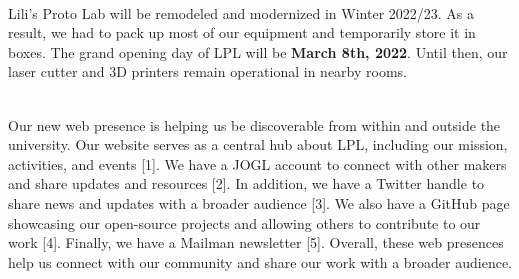 \documentclass{report}
\begin{document}
 \\

Lili's Proto Lab will be remodeled and modernized in Winter 2022/23. As a result, we had to pack up most of our equipment and temporarily store it in boxes. The grand opening day of LPL will be \textbf{March 8th, 2022}. Until then, our laser cutter and 3D printers remain operational in nearby rooms. 

\clearpage
\begin{figure}
    \centering
\end{figure}
\clearpage

 \\

Our new web presence is helping us be discoverable from within and outside the university. Our website serves as a central hub about LPL, including our mission, activities, and events [1]. We have a JOGL account to connect with other makers and share updates and resources [2]. In addition, we have a Twitter handle to share news and updates with a broader audience [3]. We also have a GitHub page showcasing our open-source projects and allowing others to contribute to our work [4]. Finally, we have a Mailman newsletter [5]. Overall, these web presences help us connect with our community and share our work with a broader audience. \\
\end{document}
